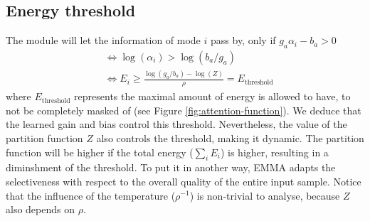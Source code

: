 \subsection*{Energy threshold}
The module will let the information of mode $i$ pass by, only if $g_a\alpha_i - b_a > 0$
\begin{equation}
\begin{split}
&\Leftrightarrow\log(\alpha_i) > \log(b_a/g_a)\\
&\Leftrightarrow E_i \geq \frac{\log(g_a/b_a) - \log(Z)}{\rho} = E_{\text{threshold}}
\end{split}
\end{equation}
where $E_{\text{threshold}}$ represents the maximal amount of energy is allowed to have, to not be completely masked of (see Figure \ref{fig:attention-function}). We deduce that the learned gain and bias control this threshold. Nevertheless, the value of the partition function $Z$ also controls the threshold, making it dynamic. The partition function will be higher if the total energy ($\sum_i E_i$) is higher, resulting in a diminshment of the threshold. To put it in another way, EMMA adapts the selectiveness with respect to the overall quality of the entire input sample. Notice that the influence of the temperature ($\rho^{-1}$) is non-trivial to analyse, because $Z$ also depends on $\rho$.

